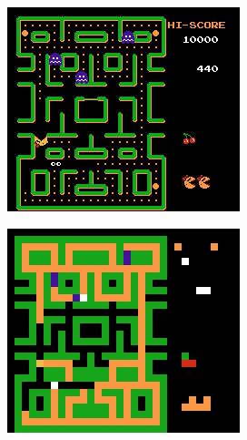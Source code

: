 \documentclass[12pt,journal,compsoc]{IEEEtran}
\begin{document}
\begin{figure}
\centering
\begin{minipage}{.25\textwidth}
  \centering
  \includegraphics[width=.95\linewidth]{Original1.png}
  \label{fig:test1}
\end{minipage}%
\begin{minipage}{.25\textwidth}
  \centering
  \includegraphics[width=.95\linewidth]{pixel1.png}
  \label{fig:test2}
\end{minipage}
\end{figure}
\end{document}
